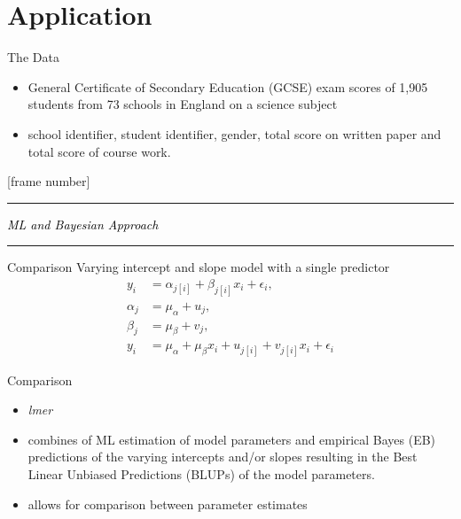 \section{Application}

\begin{frame}{The Data}
	\Large{
	\begin{itemize}
		\item[]  General Certificate of Secondary Education (GCSE) exam scores of 1,905 students from 73 schools in England on a science subject
		\item[]  school identifier, student identifier, gender, total score on written paper and total score of course work.

	\end{itemize}
	}
\end{frame}

[frame number]{}
  \begin{frame}
  \textcolor{myred}{\rule{\textwidth}{2pt}}
  \vfill
  \centering
	\itshape \LARGE \textcolor{black}{ML and Bayesian Approach}\\
  \itshape \Large \textcolor{black}{\textbf{\insertsectionhead}}
  \vfill
  \textcolor{myred}{\rule{\textwidth}{2pt}}
  \end{frame}
\addtocounter{framenumber}{-1}

\begin{frame}{Comparison}
	\Large{
		 Varying intercept and slope model with a single predictor
		\begin{align}
			y_i &= \alpha_{j[i]} + \beta_{j[i]} x_i +\epsilon_i,\\[0.5em]
			\alpha_j &= \mu_\alpha + u_j,\\[0.5em]
			\beta_j &= \mu_\beta + v_j,\\[0.5em]
			y_i &= \mu_\alpha + \mu_\beta x_i + u_{j[i]} + v_{j[i]} x_i + \epsilon_i
		\end{align}
	}
\end{frame}

\begin{frame}{Comparison}
	\Large{
		\begin{itemize}
		\item[]  \textit{lmer}
		\item[]  combines of ML estimation of model parameters and empirical Bayes (EB) predictions of the varying intercepts and/or slopes resulting in the Best Linear Unbiased Predictions (BLUPs) of the model parameters.
		\item[]  allows for comparison between parameter estimates
		\end{itemize}
	}
\end{frame}

